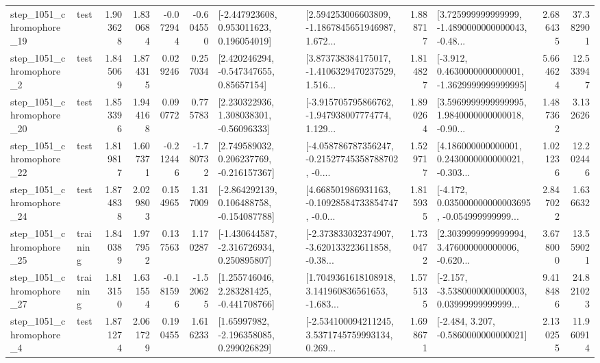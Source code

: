 \begin{tabular}{llrrrrllrlrr}
 step\_1051\_chromophore\_19 &      test &      1.903628 &    1.830684 &     -0.072944 & -0.604550 &    [-2.447923608, 0.953011623, 0.196054019] &  [2.594253006603809, -1.1867845651946987, 1.672... &       1.888717 &  [3.725999999999999, -1.4890000000000043, -0.48... &            2.686435 &         37.382901 \\
  step\_1051\_chromophore\_2 &      test &      1.845069 &    1.874315 &      0.029246 &  0.257034 &     [2.420246294, -0.547347655, 0.85657154] &  [3.873738384175017, -1.4106329470237529, 1.516... &       1.814827 &  [-3.912, 0.4630000000000001, -1.3629999999999995] &            5.664624 &         12.533947 \\
 step\_1051\_chromophore\_20 &      test &      1.853396 &    1.944168 &      0.090772 &  0.775783 &     [2.230322936, 1.308038301, -0.56096333] &  [-3.915705795866762, -1.947938007774774, 1.129... &       1.890264 &  [3.5969999999999995, 1.9840000000000018, -0.90... &            1.487362 &          3.132626 \\
 step\_1051\_chromophore\_22 &      test &      1.819817 &    1.607371 &     -0.212446 & -1.780732 &    [2.749589032, 0.206237769, -0.216157367] &  [-4.058786787356247, -0.21527745358788702, -0.... &       1.529717 &  [4.186000000000001, 0.2430000000000021, -0.303... &            1.021236 &         12.202446 \\
 step\_1051\_chromophore\_24 &      test &      1.874838 &    2.029803 &      0.154965 &  1.317009 &   [-2.864292139, 0.106488758, -0.154087788] &  [4.668501986931163, -0.10928584733854747, -0.0... &       1.815935 &  [-4.172, 0.035000000000003695, -0.054999999999... &            2.847022 &          1.636632 \\
 step\_1051\_chromophore\_25 &  training &      1.840389 &    1.977952 &      0.137563 &  1.170287 &   [-1.430644587, -2.316726934, 0.250895807] &  [-2.373833032374907, -3.620133223611858, -0.38... &       1.730472 &  [2.3039999999999994, 3.476000000000006, -0.620... &            3.678000 &         13.559021 \\
 step\_1051\_chromophore\_27 &  training &      1.813150 &    1.631554 &     -0.181596 & -1.520625 &    [1.255746046, 2.283281425, -0.441708766] &  [1.7049361618108918, 3.141960836561653, -1.683... &       1.575135 &  [-2.157, -3.5380000000000003, 0.03999999999999... &            9.418486 &         24.821023 \\
  step\_1051\_chromophore\_4 &      test &      1.871274 &    2.061729 &      0.190455 &  1.616233 &     [1.65997982, -2.196358085, 0.299026829] &  [-2.534100094211245, 3.5371745759993134, 0.269... &       1.698671 &               [-2.484, 3.207, -0.5860000000000021] &            2.130255 &         11.960914 \\

\end{tabular}

